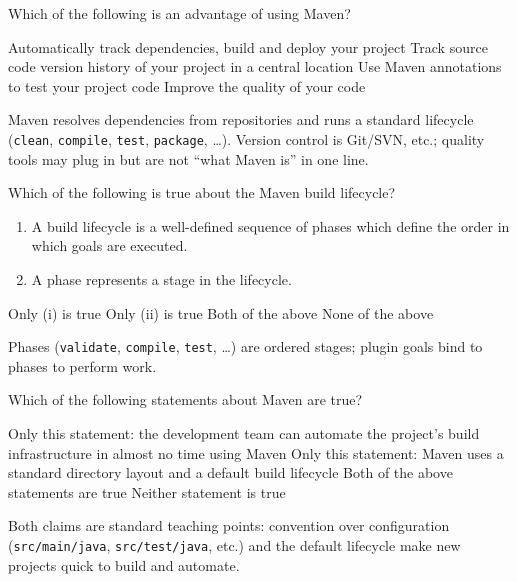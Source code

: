\question[4]
Which of the following is an advantage of using Maven?
\begin{choices}
  \CorrectChoice Automatically track dependencies, build and deploy your project
  \choice Track source code version history of your project in a central location
  \choice Use Maven annotations to test your project code
  \choice Improve the quality of your code
\end{choices}
\begin{solution}
  Maven resolves dependencies from repositories and runs a standard lifecycle (\texttt{clean}, \texttt{compile}, \texttt{test}, \texttt{package}, \ldots). Version control is Git/SVN, etc.; quality tools may plug in but are not ``what Maven is'' in one line.
\end{solution}

\question[4]
Which of the following is true about the Maven build lifecycle?
\begin{enumerate}
  \item A build lifecycle is a well-defined sequence of phases which define the order in which goals are executed.
  \item A phase represents a stage in the lifecycle.
\end{enumerate}
\begin{choices}
  \choice Only (i) is true
  \choice Only (ii) is true
  \CorrectChoice Both of the above
  \choice None of the above
\end{choices}
\begin{solution}
  Phases (\texttt{validate}, \texttt{compile}, \texttt{test}, \ldots) are ordered stages; plugin goals bind to phases to perform work.
\end{solution}

\question[4]
Which of the following statements about Maven are true?
\begin{choices}
  \choice Only this statement: the development team can automate the project's build infrastructure in almost no time using Maven
  \choice Only this statement: Maven uses a standard directory layout and a default build lifecycle
  \CorrectChoice Both of the above statements are true
  \choice Neither statement is true
\end{choices}
\begin{solution}
  Both claims are standard teaching points: convention over configuration (\texttt{src/main/java}, \texttt{src/test/java}, etc.) and the default lifecycle make new projects quick to build and automate.
\end{solution}

